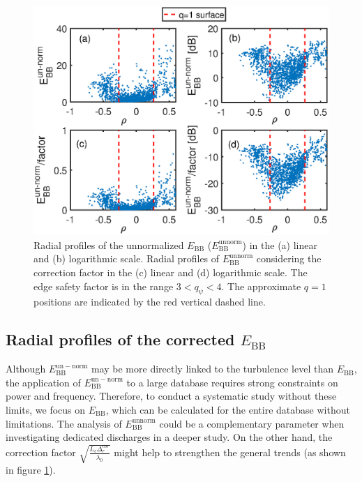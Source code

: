 \begin{figure}[h]
\begin{centering}
\includegraphics[scale=0.8]{fig_EBB_unnorm_vs_r_q34.eps}
\par\end{centering}
\caption{Radial profiles of the unnormalized $E_\mathrm{BB}$ ($E_\mathrm{BB}^\mathrm{unnorm}$) in the (a) linear and (b) logarithmic scale. Radial profiles of $E_\mathrm{BB}^\mathrm{unnorm}$ considering the correction factor in the (c) linear and (d) logarithmic scale. The edge safety factor is in the range $3 < q_{\psi} < 4$. The approximate $q = 1$ positions are indicated by the red vertical dashed line.}
\label{fig:EBB_unnorm_OH}
\end{figure}


\subsection{Radial profiles of the corrected $E_\mathrm{BB}$}

Although $E_\mathrm{BB}^\mathrm{un-norm}$ may be more directly linked to the turbulence level than $E_\mathrm{BB}$, the application of $E_\mathrm{BB}^\mathrm{un-norm}$ to a large database requires strong constraints on power and frequency. Therefore, to conduct a systematic study without these limits, we focus on $E_\mathrm{BB}$, which can be calculated for the entire database without limitations. The analysis of $E_\mathrm{BB}^\mathrm{unnorm}$ could be a complementary parameter when investigating dedicated discharges in a deeper study. On the other hand, the correction factor $\sqrt{\frac{L_{\epsilon} \Delta_r^{cor}}{\lambda_0}}$ might help to strengthen the general trends (as shown in figure \ref{fig:EBB_unnorm_OH}).

